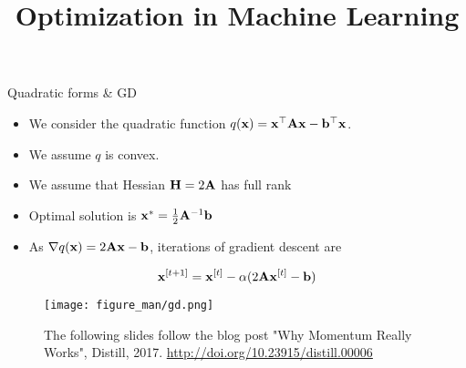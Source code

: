 \documentclass[11pt,compress,t,notes=noshow, xcolor=table]{beamer}
\title{Optimization in Machine Learning}
\begin{document}


\begin{vbframe}{Quadratic forms \& GD}

\begin{itemize}
	\item We consider the quadratic function $q(\mathbf{x}) = \mathbf{x}^\top \mathbf{A} \mathbf{x} - \mathbf{b}^\top \mathbf{x}$. 
    \item We assume $q$ is convex.
	\item We assume that Hessian $\mathbf{H} = 2 \mathbf{A}$ has full rank
	\item Optimal solution is $\mathbf{x}^\ast = \frac{1}{2} \mathbf{A}^{-1} \mathbf{b}$ 
	\item As $\nabla q(\mathbf{x}) = 2 \mathbf{A} \mathbf{x} - \mathbf{b}$, iterations of gradient descent are
\end{itemize}

\vspace{-0.5\baselineskip}

\begin{equation*}
    \mathbf{x}^{[t+1]} = \mathbf{x}^{[t]} - \alpha (2 \mathbf{A} \mathbf{x}^{[t]} - \mathbf{b})
\end{equation*}

\vspace{-\baselineskip}

\begin{figure}
	\texttt{[image: figure\_man/gd.png]}
    \caption*{\centering \footnotesize
        The following slides follow the blog post "Why Momentum Really Works", Distill, 2017.
        \url{http://doi.org/10.23915/distill.00006}}
\end{figure}

\end{vbframe}
\end{document}
